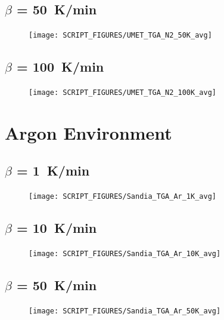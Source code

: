 \documentclass{book}
\begin{document}
\begin{landscape}
\newpage
\subsection{$\beta$ = 50~K/min}
\begin{minipage}{0.65\textwidth}
\begin{figure}[H]
{\texttt{[image: SCRIPT\_FIGURES/UMET\_TGA\_N2\_50K\_avg]}}\\
\end{figure}
\end{minipage} 

\newpage
\subsection{$\beta$ = 100~K/min}
\begin{minipage}{0.65\textwidth}
\begin{figure}[H]
{\texttt{[image: SCRIPT\_FIGURES/UMET\_TGA\_N2\_100K\_avg]}}\\
\end{figure}
\end{minipage} 
\vfill

\section{Argon Environment}
\label{TGA_Ar}
\subsection{$\beta$ = 1~K/min}
\begin{minipage}{0.65\textwidth}
\begin{figure}[H]
{\texttt{[image: SCRIPT\_FIGURES/Sandia\_TGA\_Ar\_1K\_avg]}}\\
\end{figure}
\end{minipage} 
\vfill

\subsection{$\beta$ = 10~K/min}
\begin{minipage}{0.65\textwidth}
\begin{figure}[H]
{\texttt{[image: SCRIPT\_FIGURES/Sandia\_TGA\_Ar\_10K\_avg]}}\\
\end{figure}
\end{minipage} 
\vfill

\subsection{$\beta$ = 50~K/min}
\begin{minipage}{0.65\textwidth}
\begin{figure}[H]
{\texttt{[image: SCRIPT\_FIGURES/Sandia\_TGA\_Ar\_50K\_avg]}}\\
\end{figure}
\end{minipage} 
\vfill


\end{landscape}
\end{document}
